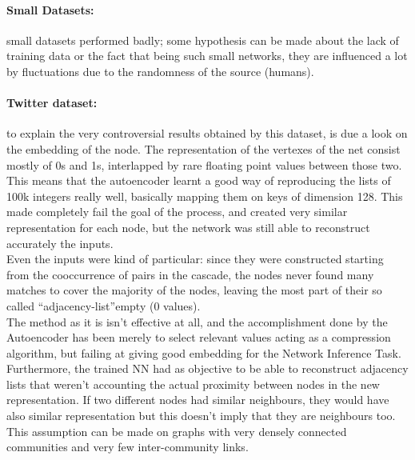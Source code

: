 \documentclass{article}
\begin{document}
			
				\paragraph{Small Datasets:} small datasets performed badly; some hypothesis can be made about the lack of training data or the fact that being such small networks, they are influenced a lot by fluctuations due to the randomness of the source (humans).
				\paragraph{Twitter dataset:} to explain the very controversial results obtained by this dataset, is due a look on the embedding of the node. The representation of the vertexes of the net consist mostly of 0s and 1s, interlapped by rare floating point values between those two. This means that the autoencoder learnt a good way of reproducing the lists of 100k integers really well, basically mapping them on keys of dimension 128. This made completely fail the goal of the process, and created very similar representation for each node, but the network was still able to reconstruct accurately the inputs.\\
				Even the inputs were kind of particular: since they were constructed starting from the cooccurrence of pairs in the cascade, the nodes never found many matches to cover the majority of the nodes, leaving the most part of their so called \textquotedblleft adjacency-list\textquotedblright empty (0 values). \bigskip \\
				The method as it is isn't effective at all, and the accomplishment done by the Autoencoder has been merely to select relevant values acting as a compression algorithm, but failing at giving good embedding for the Network Inference Task. Furthermore, the trained NN had as objective to be able to reconstruct adjacency lists that weren't accounting the actual proximity between nodes in the new representation. If two different nodes had similar neighbours, they would have also similar representation but this doesn't imply that they are neighbours too. This assumption can be made on graphs with very densely connected communities and very few inter-community links.
				
				\newpage
\end{document}
